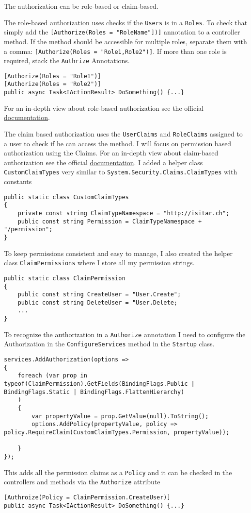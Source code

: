 \documentclass[12pt, a4paper, parskip=half]{scrreprt}
\begin{document}
The authorization can be role-based or claim-based. 

The role-based authorization uses checks if the \lstinline|Users| is in a \lstinline|Roles|. To check that simply add the \lstinline|[Authorize(Roles = "RoleName"])]| annotation to a controller method. If the method should be accessible for multiple roles, separate them with a comma: \lstinline|[Authorize(Roles = "Role1,Role2")]|. If more than one role is required, stack the \lstinline|Authrize| Annotations.
\begin{lstlisting}
[Authorize(Roles = "Role1")]
[Authorize(Roles = "Role2")]
public async Task<IActionResult> DoSomething() {...}
\end{lstlisting}
 For an in-depth view about role-based authorization see the official  \href{https://docs.microsoft.com/en-us/aspnet/core/security/authorization/roles}{documentation}.
 
The claim based authorization uses the \lstinline|UserClaims| and \lstinline|RoleClaims| assigned to a user to check if he can access the method.  I will focus on permission based authorization using the Claims. For an in-depth view about claim-based authorization see the official  \href{https://docs.microsoft.com/en-us/aspnet/core/security/authorization/claims}{documentation}.
I added a helper class \lstinline|CustomClaimTypes| very similar to \lstinline|System.Security.Claims.ClaimTypes| with constants
\begin{lstlisting}
public static class CustomClaimTypes
{
	private const string ClaimTypeNamespace = "http://isitar.ch";
	public const string Permission = ClaimTypeNamespace + "/permission";
}
\end{lstlisting}
To keep permissions consistent and easy to manage, I also created the helper class \lstinline|ClaimPermissions| where I store all my permission strings.
\begin{lstlisting}
public static class ClaimPermission
{
	public const string CreateUser = "User.Create";
	public const string DeleteUser = "User.Delete;
	...
}
\end{lstlisting}
To recognize the authorization in a \lstinline|Authorize| annotation I need to configure the Authorization in the \lstinline|ConfigureServices| method in the \lstinline|Startup| class.
\begin{lstlisting}
services.AddAuthorization(options =>
{
	foreach (var prop in typeof(ClaimPermission).GetFields(BindingFlags.Public | BindingFlags.Static | BindingFlags.FlattenHierarchy)
	)
	{
		var propertyValue = prop.GetValue(null).ToString();
		options.AddPolicy(propertyValue, policy => policy.RequireClaim(CustomClaimTypes.Permission, propertyValue));

	}
});
\end{lstlisting}
This adds all the permission claims as a \lstinline|Policy| and it can be checked in the controllers and methods via the \lstinline|Authorize| attribute
\begin{lstlisting}
[Authroize(Policy = ClaimPermission.CreateUser)]
public async Task<IActionResult> DoSomething() {...}
\end{lstlisting}
\end{document}
